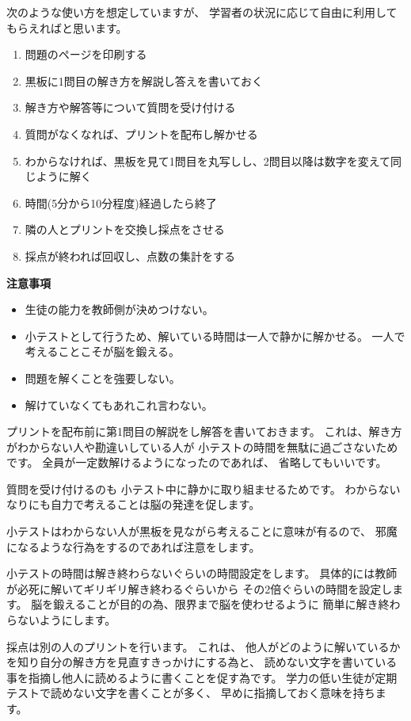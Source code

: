 次のような使い方を想定していますが、
学習者の状況に応じて自由に利用してもらえればと思います。

\begin{enumerate}
 \item 問題のページを印刷する
 \item 黒板に1問目の解き方を解説し答えを書いておく
 \item 解き方や解答等について質問を受け付ける
 \item 質問がなくなれば、プリントを配布し解かせる
 \item わからなければ、黒板を見て1問目を丸写しし、2問目以降は数字を変えて同じように解く
 \item 時間(5分から10分程度)経過したら終了
 \item 隣の人とプリントを交換し採点をさせる
 \item 採点が終われば回収し、点数の集計をする
\end{enumerate}


\textbf{注意事項}
\begin{itemize}
 \item 生徒の能力を教師側が決めつけない。
 \item 小テストとして行うため、解いている時間は一人で静かに解かせる。
       一人で考えることこそが脳を鍛える。
 \item 問題を解くことを強要しない。
 \item 解けていなくてもあれこれ言わない。
\end{itemize}


プリントを配布前に第1問目の解説をし解答を書いておきます。
これは、解き方がわからない人や勘違いしている人が
小テストの時間を無駄に過ごさないためです。
全員が一定数解けるようになったのであれば、
省略してもいいです。

質問を受け付けるのも
小テスト中に静かに取り組ませるためです。
わからないなりにも自力で考えることは脳の発達を促します。

小テストはわからない人が黒板を見ながら考えることに意味が有るので、
邪魔になるような行為をするのであれば注意をします。

小テストの時間は解き終わらないぐらいの時間設定をします。
具体的には教師が必死に解いてギリギリ解き終わるぐらいから
その2倍ぐらいの時間を設定します。
脳を鍛えることが目的の為、限界まで脳を使わせるように
簡単に解き終わらないようにします。

採点は別の人のプリントを行います。
これは、
他人がどのように解いているかを知り自分の解き方を見直すきっかけにする為と、
読めない文字を書いている事を指摘し他人に読めるように書くことを促す為です。
学力の低い生徒が定期テストで読めない文字を書くことが多く、
早めに指摘しておく意味を持ちます。

